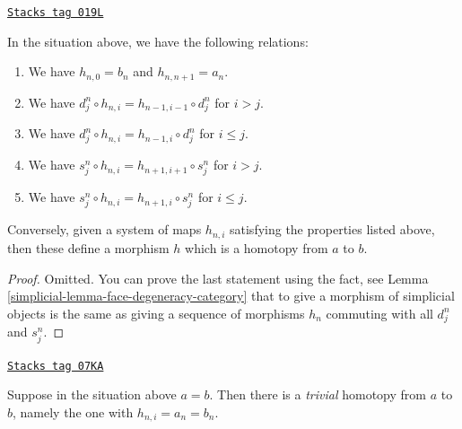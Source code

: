 \begin{lemma}
\label{simplicial-lemma-relations-homotopy}
\href{https://stacks.math.columbia.edu/tag/019L}{\texttt{Stacks tag 019L}}

In the situation above, we have the following relations:
\begin{enumerate}
\item We have $h_{n, 0} = b_n$ and $h_{n, n + 1} = a_n$.
\item We have $d^n_j \circ h_{n, i} = h_{n - 1, i - 1} \circ d^n_j$
for $i > j$.
\item We have $d^n_j \circ h_{n, i} = h_{n - 1, i} \circ d^n_j$
for $i \leq j$.
\item We have $s^n_j \circ h_{n, i} = h_{n + 1, i + 1} \circ s^n_j$
for $i > j$.
\item We have $s^n_j \circ h_{n, i} = h_{n + 1, i} \circ s^n_j$
for $i \leq j$.
\end{enumerate}
Conversely, given a system of maps $h_{n, i}$ satisfying the
properties listed above, then these define a morphism
$h$ which is a homotopy from $a$ to $b$.
\end{lemma}

\begin{proof}

Omitted. You can prove the last statement using the fact,
see Lemma \ref{simplicial-lemma-face-degeneracy-category} that
to give a morphism of simplicial objects is the
same as giving a sequence of morphisms $h_n$ commuting
with all $d^n_j$ and $s^n_j$.
\end{proof}

\begin{example}
\label{simplicial-example-trivial-homotopy}
\href{https://stacks.math.columbia.edu/tag/07KA}{\texttt{Stacks tag 07KA}}

Suppose in the situation above $a = b$. Then there is a {\it trivial}
homotopy from $a$ to $b$, namely the one with $h_{n, i} = a_n = b_n$.
\end{example}

